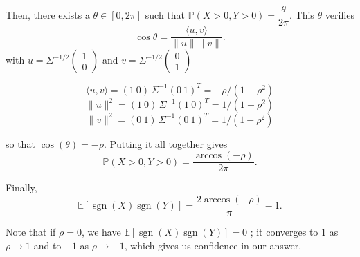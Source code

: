 Then, there exists a $\theta \in [0,2\pi]$ such that $\mathbb{P}(X>0,Y>0) = \dfrac{\theta}{2\pi}$. This $\theta$ verifies $$\cos{\theta} = \dfrac{\langle u,v\rangle}{\|u\| \|v\|}.$$ with $u = \Sigma^{-1/2} \begin{pmatrix}1\\0\end{pmatrix}$ and $v = \Sigma^{-1/2} \begin{pmatrix}0\\1\end{pmatrix}$


$$\langle u,v\rangle = (1\ 0)\,\Sigma^{-1}(0\ 1)^T=-\rho/(1-\rho^2)$$
$$\|u\|^2=(1\ 0)\,\Sigma^{-1}(1\ 0)^T=1/(1-\rho^2)$$
$$\|v\|^2=(0\ 1)\,\Sigma^{-1}(0\ 1)^T=1/(1-\rho^2)$$

so that $\cos(\theta)=-\rho.$ Putting it all together gives 
$$\mathbb{P}(X>0,Y>0)=\dfrac{\arccos(-\rho)}{ 2\pi}.$$

Finally, $$\boxed{ \mathbb{E}[\operatorname{sgn}(X)\operatorname{sgn}(Y)] = \dfrac{2\arccos(-\rho)}{\pi} - 1. }$$

Note that if $\rho=0$, we have $\mathbb{E}[\operatorname{sgn}(X)\operatorname{sgn}(Y)]=0$ ; it converges to $1$ as $\rho \longrightarrow 1$ and to $-1$ as $\rho \longrightarrow -1$, which gives us confidence in our answer.
